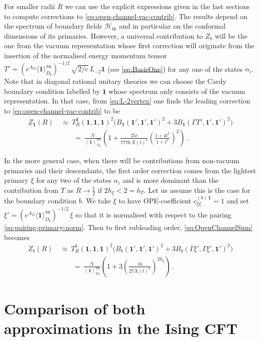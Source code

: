 \documentclass[11pt,a4paper]{article}
\numberwithin{equation}{section}
\newcommand{\one}{\mathbf{1}} %
\begin{document}
For smaller radii $R$ we can use the explicit expressions given in the last sections to compute corrections to \eqref{eq:open-channel-vac-contrib}. 
The results depend on the spectrum of boundary fields $\mathcal{H}_{bb}$ 
and in particular on the conformal dimensions of its primaries. However, a universal contribution to $Z_b$ will be the one from the vacuum representation whose first correction will originate from the insertion of the normalised energy momentum tensor $T' = (e^{A_D} \langle \one \rangle^\mathrm{un}_{D_b})^{-1/2}\, \sqrt{2/c}\,L_{-2}\one$ (see \eqref{eq:BasisOne}) for any one of the states $\alpha_i$. Note that in diagonal rational unitary theories we can choose the Cardy boundary condition labelled by $\one$ whose spectrum only consists of the vacuum representation.
In that case, from \eqref{eq:L-2vertex} one finds the leading correction to \eqref{eq:open-channel-vac-contrib} to be
\begin{align}
    Z_\one(R) &~\approx~ T_R^\one(\one,\one,\one)^2 \Big(B_\one(\one',\one',\one')^2 + 3 B_\one(\Gamma T',\one',\one')^2\Big) \nonumber \\
   &\qquad =~\frac{\mathcal{N}}{\left\langle\one\right\rangle_{D_\one}^\mathrm{un}}
   \left(1 +  \frac{25 c}{7776 \, X(t)^4} \left(\frac{1+4t^2}{1+t^2}\right)^{\!2} \right) \,.
\end{align}

\noindent
In the more general case, when there will be contributions from non-vacuum primaries and their descendants, the first order correction comes from the lightest primary $\xi$ for any two of the states $\alpha_i$ and is more dominant than the contribution from $T$ as $R\to\frac{1}{2}$ if $2h_\xi<2 = h_T$. Let us assume this is the case for the boundary condition $b$. 
We take $\xi$ to have OPE-coefficient $c_{\xi\xi}^{(b)\,\one}=1$ and set $\xi' = (e^{A_D} \langle \one \rangle^\mathrm{un}_{D_b})^{-1/2}\, \xi$ so that it is normalised with respect to the pairing \eqref{eq:pairing-primary-norm}. Then to first subleading order, \eqref{eq:OpenChannelSum} becomes
%
\begin{align}
    Z_b(R) &~\approx~ T_R^b(\one,\one,\one)^2 \Big(B_b(\one',\one',\one')^2 + 3 B_b(\Gamma \xi',\Gamma \xi',\one')^2\Big)
    \nonumber \\
   &\qquad =~\frac{\mathcal{N}}{\left\langle\one\right\rangle_{D_b}^\mathrm{un}}\left(1 + 3 \left(\frac{16}{27 X(t)^2}\right)^{2h_\xi} \right)\,.\label{eq:openLeading}
\end{align}

\section{Comparison of both approximations in the Ising CFT}\label{sec:Ising-compare}
\end{document}

